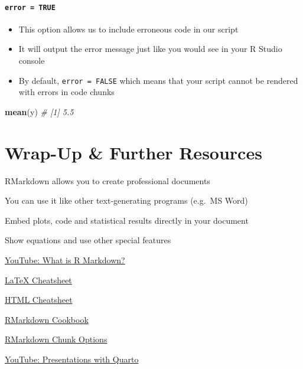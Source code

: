 \documentclass[
]{book}
\newenvironment{Shaded}{\begin{snugshade}}{\end{snugshade}}
\newcommand{\CommentTok}[1]{\textcolor[rgb]{0.56,0.35,0.01}{\textit{#1}}}
\newcommand{\FunctionTok}[1]{\textcolor[rgb]{0.13,0.29,0.53}{\textbf{#1}}}
\newcommand{\NormalTok}[1]{#1}
\providecommand{\tightlist}{%
  \setlength{\itemsep}{0pt}\setlength{\parskip}{0pt}}
\begin{document}
\paragraph*{\texorpdfstring{\texttt{error\ =\ TRUE}}{error = TRUE}}\label{error-true}

\begin{itemize}
\tightlist
\item
  This option allows us to include erroneous code in our script
\item
  It will output the error message just like you would see in your R Studio console
\item
  By default, \texttt{error\ =\ FALSE} which means that your script cannot be rendered with errors in code chunks
\end{itemize}

\begin{Shaded}
\begin{Highlighting}[]
\FunctionTok{mean}\NormalTok{(y)}
\CommentTok{\# [1] 5.5}
\end{Highlighting}
\end{Shaded}

\section*{Wrap-Up \& Further Resources}\label{wrap-up-further-resources-8}

RMarkdown allows you to create professional documents

You can use it like other text-generating programs (e.g.~MS Word)

Embed plots, code and statistical results directly in your document

Show equations and use other special features

\href{https://www.youtube.com/watch?v=asHhuHRxhvo&ab_channel=EquitableEquations/}{YouTube: What is R Markdown?}

\href{https://wch.github.io/latexsheet/}{LaTeX Cheatsheet}

\href{https://web.stanford.edu/group/csp/cs21/htmlcheatsheet.pdf}{HTML Cheatsheet}

\href{https://bookdown.org/yihui/rmarkdown-cookbook/}{RMarkdown Cookbook}

\href{https://yihui.org/knitr/options/}{RMarkdown Chunk Options}

\href{https://www.youtube.com/watch?v=01KifhHDkFk&ab_channel=EquitableEquations}{YouTube: Presentations with Quarto}
\end{document}
